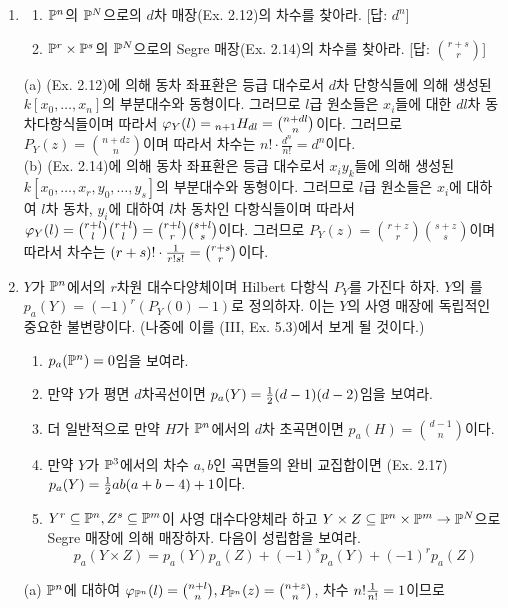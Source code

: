 	\begin{enumerate}[label=\tb{7.\arabic*.},itemindent=0mm,itemsep=4mm]
	\item \begin{enumerate}[label=(\alph*)]
	\item $\mathbb{P}^n$의 $\mathbb{P}^N$으로의 $d$차 매장(Ex. 2.12)의 차수를 찾아라. [답: $d^n$]
	\item $\mathbb{P}^r\times\mathbb{P}^s$의 $\mathbb{P}^N$으로의 Segre 매장(Ex. 2.14)의 차수를 찾아라. [답: $\binom{r+s}r$]
	\end{enumerate}
	\sol (a) (Ex. 2.12)에 의해 동차 좌표환은 등급 대수로서 $d$차 단항식들에 의해 생성된 $k[x_0,\ldots,x_n]$의 부분대수와 동형이다.
	그러므로 $l$급 원소들은 $x_i$들에 대한 $dl$차 동차다항식들이며 따라서 $\varphi_Y(l)={}_{n+1}H_{dl}=\binom{n+dl}{n}$이다.
	그러므로 $P_Y(z)=\binom{n+dz}n$이며 따라서 차수는 $n!\cdot\frac{d^n}{n!}=d^n$이다.\\
	(b) (Ex. 2.14)에 의해 동차 좌표환은 등급 대수로서 $x_iy_k$들에 의해 생성된
	$k[x_0,\ldots,x_r,y_0,\ldots,y_s]$의 부분대수와 동형이다.
	그러므로 $l$급 원소들은 $x_i$에 대하여 $l$차 동차, $y_i$에 대하여 $l$차 동차인 다항식들이며
	따라서 $\varphi_Y(l)=\binom{r+l}l\binom{r+l}l=\binom{r+l}{r}\binom{s+l}s$이다.
	그러므로 $P_Y(z)=\binom{r+z}r\binom{s+z}s$이며 따라서 차수는 $(r+s)!\cdot\frac{1}{r!s!}=\binom{r+s}r$이다.
	\item $Y$가 $\mathbb{P}^n$에서의 $r$차원 대수다양체이며 Hilbert 다항식 $P_Y$를 가진다 하자.
	$Y$의 를 $p_a(Y)=(-1)^r(P_Y(0)-1)$로 정의하자.
	이는 $Y$의 사영 매장에 독립적인 중요한 불변량이다. (나중에 이를 (III, Ex. 5.3)에서 보게 될 것이다.)
	\begin{enumerate}[label=(\alph*)]
	\item $p_a(\mathbb{P}^n)=0$임을 보여라.
	\item 만약 $Y$가 평면 $d$차곡선이면 $p_a(Y)=\frac{1}{2}(d-1)(d-2)$임을 보여라.
	\item 더 일반적으로 만약 $H$가 $\mathbb{P}^n$에서의 $d$차 초곡면이면 $p_a(H)=\binom{d-1}n$이다.
	\item 만약 $Y$가 $\mathbb{P}^3$에서의 차수 $a,b$인 곡면들의 완비 교집합이면 (Ex. 2.17)
	$p_a(Y)=\frac{1}{2}ab(a+b-4)+1$이다.
	\item $Y^r\subseteq\mathbb{P}^n,Z^s\subseteq\mathbb{P}^m$이 사영 대수다양체라 하고
	$Y\times Z\subseteq\mathbb{P}^n\times\mathbb{P}^m\rightarrow\mathbb{P}^N$으로 Segre 매장에 의해 매장하자. 다음이 성립함을 보여라.
	$$p_a(Y\times Z)=p_a(Y)p_a(Z)+(-1)^sp_a(Y)+(-1)^rp_a(Z)$$
	\end{enumerate}
	\sol (a) $\mathbb{P}^n$에 대하여 $\varphi_{\mathbb{P}^n}(l)=\binom{n+l}n,P_{\mathbb{P}^n}(z)=\binom{n+z}n$, 차수 $n!\frac{1}{n!}=1$이므로

\end{enumerate}
